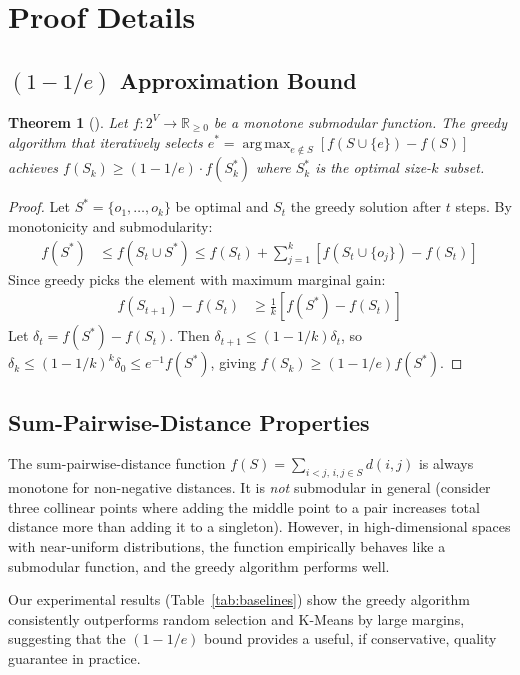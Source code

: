 \documentclass[11pt]{article}
\newtheorem{theorem}{Theorem}[section]
\DeclareMathOperator*{\argmax}{arg\,max}
\begin{document}
\section{Proof Details}
\label{app:submodular-proof}

\subsection{$(1-1/e)$ Approximation Bound}

\begin{theorem}[\citet{nemhauser1978analysis}]
Let $f: 2^V \to \mathbb{R}_{\geq 0}$ be a monotone submodular function.
The greedy algorithm that iteratively selects
$e^* = \argmax_{e \notin S} [f(S \cup \{e\}) - f(S)]$
achieves $f(S_k) \geq (1 - 1/e) \cdot f(S^*_k)$ where $S^*_k$
is the optimal size-$k$ subset.
\end{theorem}

\begin{proof}
Let $S^* = \{o_1, \ldots, o_k\}$ be optimal and $S_t$ the greedy
solution after $t$ steps. By monotonicity and submodularity:
\begin{align}
f(S^*) &\leq f(S_t \cup S^*) \leq f(S_t) + \sum_{j=1}^k [f(S_t \cup \{o_j\}) - f(S_t)]
\end{align}
Since greedy picks the element with maximum marginal gain:
\begin{align}
f(S_{t+1}) - f(S_t) &\geq \frac{1}{k}[f(S^*) - f(S_t)]
\end{align}
Let $\delta_t = f(S^*) - f(S_t)$. Then $\delta_{t+1} \leq (1 - 1/k)\delta_t$,
so $\delta_k \leq (1-1/k)^k \delta_0 \leq e^{-1} f(S^*)$, giving
$f(S_k) \geq (1 - 1/e)f(S^*)$.
\end{proof}

\subsection{Sum-Pairwise-Distance Properties}

The sum-pairwise-distance function $f(S) = \sum_{i<j,\, i,j\in S} d(i,j)$
is always monotone for non-negative distances. It is \emph{not}
submodular in general (consider three collinear points where adding
the middle point to a pair increases total distance more than adding
it to a singleton). However, in high-dimensional spaces with
near-uniform distributions, the function empirically behaves like
a submodular function, and the greedy algorithm performs well.

Our experimental results (Table~\ref{tab:baselines}) show the greedy
algorithm consistently outperforms random selection and K-Means
by large margins, suggesting that the $(1-1/e)$ bound provides a
useful, if conservative, quality guarantee in practice.
\end{document}
